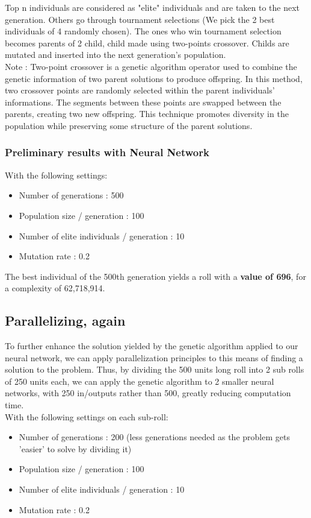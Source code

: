 \documentclass{modeleRapport}
\begin{document}
Top n individuals are considered as "elite" individuals and are taken to the next generation. Others go through tournament
selections (We pick the 2 best individuals of 4 randomly chosen). The ones who win tournament selection becomes parents of 
2 child, child made using two-points crossover. Childs are mutated and inserted into the next generation's population.\\

Note : Two-point crossover is a genetic algorithm operator used to combine the genetic information of two parent solutions to 
produce offspring. In this method, two crossover points are randomly selected within the parent individuals' informations. 
The segments between these points are swapped between the parents, creating two new offspring. This technique promotes 
diversity in the population while preserving some structure of the parent solutions.

\subsubsection{Preliminary results with Neural Network}

With the following settings:
\begin{itemize}
    \item Number of generations : 500
    \item Population size / generation : 100
    \item Number of elite individuals / generation : 10
    \item Mutation rate : 0.2
\end{itemize}

The best individual of the 500th generation yields a roll with a \textbf{value of 696}, for a complexity of 62,718,914.

\subsection{Parallelizing, again}

To further enhance the solution yielded by the genetic algorithm applied to our neural network, we can apply parallelization 
principles to this means of finding a solution to the problem. Thus, by dividing the 500 units long roll into 2 sub rolls of 250 units each, we can apply the genetic algorithm to 2 smaller 
neural networks, with 250 in/outputs rather than 500, greatly reducing computation time.\\

With the following settings on each sub-roll:
\begin{itemize}
    \item Number of generations : 200 (less generations needed as the problem gets 'easier' to solve by dividing it)
    \item Population size / generation : 100
    \item Number of elite individuals / generation : 10
    \item Mutation rate : 0.2\\
\end{itemize}
\end{document}

